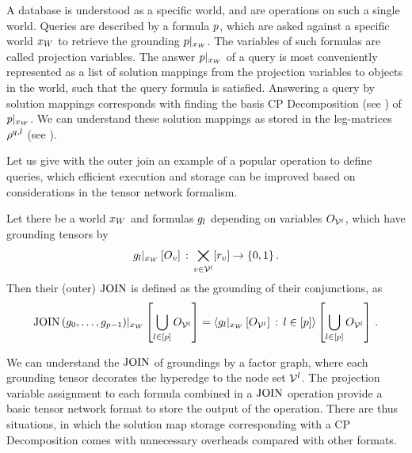 
A database is understood as a specific \firstOrderLogic{} world, and are operations on such a single world.
Queries are described by a formula $p$, which are asked against a specific world $x_{W}$ to retrieve the grounding ${p}|_{x_{W}}$.
The variables of such formulas are called projection variables.
The answer ${p}|_{x_{W}}$ of a query is most conveniently represented as a list of solution mappings from the projection variables to objects in the world, such that the query formula is satisfied.
Answering a query by solution mappings corresponds with finding the basis CP Decomposition (see ) of ${p}|_{x_{W}}$.
We can understand these solution mappings as stored in the leg-matrices $\rho^{q,l}$ (see ).

Let us give with the outer join an example of a popular operation to define queries, which efficient execution and storage can be improved based on considerations in the tensor network formalism.

\begin{definition}
    Let there be a world $x_{W}$ and formulas $g_{l}$ depending on variables $O_{\mathcal{V}^{l}}$, which have grounding tensors by
    \begin{align*}
        {g_{l}}|_{x_{W}} \left[O_{v}\right] \,:\,  \bigtimes_{v\in\mathcal{V}^{l}}[r_{v}] \rightarrow \{0,1\} \, .
    \end{align*}
    Then their (outer) $\mathrm{JOIN}$ is defined as the grounding of their conjunctions, as
    \begin{align*}
        {\mathrm{JOIN}\left(g_{0},\ldots,g_{p-1}\right)}|_{x_{W}} \left[\bigcup_{l\in[p]}O_{\mathcal{V}^{l}}\right]
        = \left\langle {g_{l}}|_{x_{W}} \left[O_{\mathcal{V}^{l}}\right]\,:\,l\in[p]\right\rangle \left[ \bigcup_{l\in[p]}O_{\mathcal{V}^{l}} \right] \, .
    \end{align*}
\end{definition}

We can understand the $\mathrm{JOIN}$ of groundings by a factor graph, where each grounding tensor decorates the hyperedge to the node set $\mathcal{V}^{l}$.
The projection variable assignment to each formula combined in a $\mathrm{JOIN}$ operation provide a basic tensor network format to store the output of the operation.
There are thus situations, in which the solution map storage corresponding with a CP Decomposition comes with unnecessary overheads compared with other formats.

